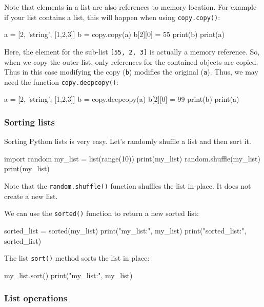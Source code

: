 \documentclass[12pt]{article} \newif\ifsolution\solutiontrue %
\begin{document}
Note that elements in a list are also references to memory location. For
example if your list contains a list, this will happen when using
\texttt{copy.copy()}:

\begin{python}
a = [2, 'string', [1,2,3]] b = copy.copy(a) b[2][0] = 55 print(b) print(a)
\end{python}

Here, the element for the sub-list \texttt{{[}55,\ 2,\ 3{]}} is actually
a memory reference. So, when we copy the outer list, only references for
the contained objects are copied. Thus in this case modifying the copy
(\texttt{b}) modifies the original (\texttt{a}). Thus, we may need the
function \texttt{copy.deepcopy()}:

\begin{python}
a = [2, 'string', [1,2,3]]
b = copy.deepcopy(a)
b[2][0] = 99
print(b)
print(a)
\end{python}

\subsubsection{Sorting lists}\label{sorting-lists}

Sorting Python lists is very easy. Let's randomly shuffle a list and
then sort it.

\begin{python}
import random my_list = list(range(10)) print(my_list) random.shuffle(my_list) print(my_list)
\end{python}

Note that the \texttt{random.shuffle()} function shuffles the list
in-place. It does not create a new list.

We can use the \texttt{sorted()} function to return a new sorted list:

\begin{python}
sorted_list = sorted(my_list) print("my_list:", my_list) print("sorted_list:", sorted_list)
\end{python}

The list \texttt{sort()} method sorts the list in place:

\begin{python}
my_list.sort() print("my_list:", my_list)
\end{python}

\subsubsection{List operations}\label{list-operations}
\end{document}
